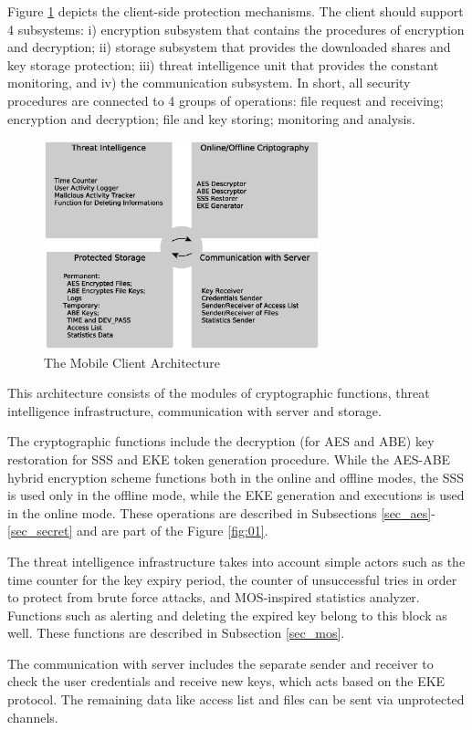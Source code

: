 \documentclass[twocolumn]{svjour3}          	%
\begin{document}
Figure \ref{fig:02} depicts the client-side protection mechanisms. The client should support 4 subsystems: i) encryption subsystem that contains the procedures of encryption and decryption; ii) storage subsystem that provides the downloaded shares and key storage protection; iii) threat intelligence unit that provides the constant monitoring, and iv) the communication subsystem. In short, all security procedures are connected to 4 groups of operations: file request and receiving; encryption and decryption; file and key storing; monitoring and analysis.

\begin{figure}[h!]
	\centering
	\includegraphics[width=8cm]{fig02.eps}
	\caption{The Mobile Client Architecture}
	\label{fig:02}
\end{figure}

This architecture consists of the modules of cryptographic functions, threat intelligence infrastructure, communication with server and storage.

The cryptographic functions include the decryption (for AES and ABE) key restoration for SSS and EKE token generation procedure. While the AES-ABE hybrid encryption scheme functions both in the online and offline modes, the SSS is used only in the offline mode, while the EKE generation and executions is used in the online mode. These operations are described in Subsections \ref{sec_aes}-\ref{sec_secret} and are part of the Figure \ref{fig:01}.

The threat intelligence infrastructure takes into account simple actors such as the time counter for the key expiry period, the counter of unsuccessful tries in order to protect from brute force attacks, and MOS-inspired statistics analyzer. Functions such as alerting and deleting the expired key belong to this block as well. These functions are described in Subsection \ref{sec_mos}.

The communication with server includes the separate sender and receiver to check the user credentials and receive new keys, which acts based on the EKE protocol. The remaining data like access list and files can be sent via unprotected channels. 
\end{document}
